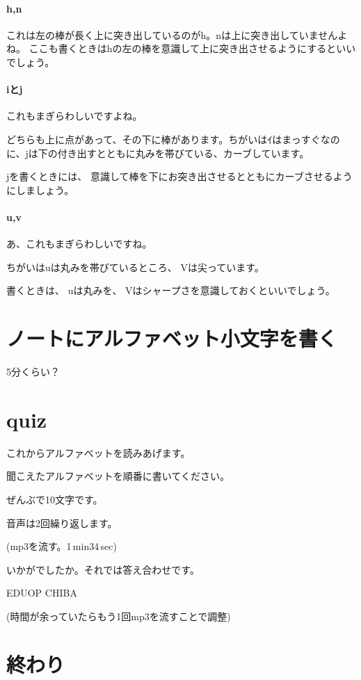 \documentclass[book,jafontscale=0.9247]{jlreq}
\begin{document}
\paragraph{h,n}

これは左の棒が長く上に突き出しているのがh。nは上に突き出していませんよね。
ここも書くときはhの左の棒を意識して上に突き出させるようにするといいでしょう。

\paragraph{iとj}
これもまぎらわしいですよね。

どちらも上に点があって、その下に棒があります。ちがいはｲはまっすぐなのに、jは下の付き出すとともに丸みを帯びている、カーブしています。

jを書くときには、
意識して棒を下にお突き出させるとともにカーブさせるようにしましょう。

\paragraph{u,v}

あ、これもまぎらわしいですね。

ちがいはuは丸みを帯びているところ、
Vは尖っています。

書くときは、
uは丸みを、
Vはシャープさを意識しておくといいでしょう。

\section{ノートにアルファベット小文字を書く}

5分くらい？

\section{quiz}

これからアルファベットを読みあげます。

聞こえたアルファベットを順番に書いてください。

ぜんぶで10文字です。

音声は2回繰り返します。

(mp3を流す。1\,min34\,sec)

いかがでしたか。それでは答え合わせです。

EDUOP CHIBA

(時間が余っていたらもう1回mp3を流すことで調整)
\section{終わり}
\end{document}

